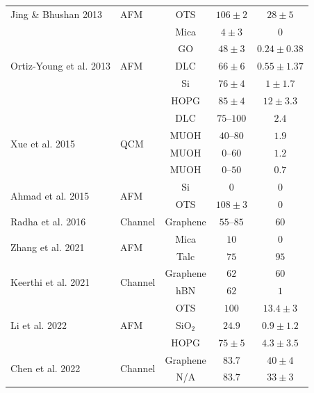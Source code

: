 \documentclass[journal=jacsat,manuscript=article]{achemso}
\begin{document}
\begin{table}
{{\begin{tabular}{llccc}
Jing \& Bhushan 2013\cite{Jing2013-kn} & AFM & OTS & $106 \pm 2$ & $28 \pm 5$ \\
\cline{1-5}

\multirow{5}{*}{Ortiz-Young et al. 2013\cite{Ortiz-Young2013-wc}} & \multirow{5}{*}{AFM} & Mica & $4 \pm 3$ & $0$ \\
 &  & GO & $48 \pm 3$ & $0.24 \pm 0.38$ \\
 &  & DLC & $66 \pm 6$ & $0.55 \pm 1.37$ \\
 &  & Si & $76 \pm 4$ & $1 \pm 1.7$ \\
 &  & HOPG & $85 \pm 4$ & $12 \pm 3.3$ \\
\cline{1-5}

\multirow{4}{*}{Xue et al. 2015\cite{Xue2015-tu}} & \multirow{4}{*}{QCM} & DLC & $75$--$100$ & $2.4$ \\
 &  & MUOH & $40$--$80$ & $1.9$ \\
 &  & MUOH & $0$--$60$ & $1.2$ \\
 &  & MUOH & $0$--$50$ & $0.7$ \\
\cline{1-5}

\multirow{2}{*}{Ahmad et al. 2015\cite{Ahmad2015-eb}} & \multirow{2}{*}{AFM} & Si & $0$ & $0$ \\
 &  & OTS & $108 \pm 3$ & $0$ \\
\cline{1-5}

Radha et al. 2016\cite{Radha2016-bk} & Channel & Graphene & $55$--$85$ & $60$ \\
\cline{1-5}

\multirow{2}{*}{Zhang et al. 2021\cite{Zhang2021-tn}} & \multirow{2}{*}{AFM} & Mica & $10$ & $0$ \\
 &  & Talc & $75$ & $95$ \\
\cline{1-5}

\multirow{2}{*}{Keerthi et al. 2021\cite{Keerthi2021-mz}} & \multirow{2}{*}{Channel} & Graphene & $62$ & $60$ \\
 &  & hBN & $62$ & $1$ \\
\cline{1-5}

\multirow{3}{*}{Li et al. 2022\cite{Li2022-qs}} & \multirow{3}{*}{AFM} & OTS & $100$ & $13.4 \pm 3$ \\
 &  & SiO$_2$ & $24.9$ & $0.9 \pm 1.2$ \\
 &  & HOPG & $75 \pm 5$ & $4.3 \pm 3.5$ \\
\cline{1-5}

\multirow{2}{*}{Chen et al. 2022\cite{Chen2022-hs}} & \multirow{2}{*}{Channel} & Graphene & $83.7$ & $40 \pm 4$ \\
 &  & N/A & $83.7$ & $33 \pm 3$ \\
\cline{1-5}


\end{tabular}}}
\end{table}
\end{document}
